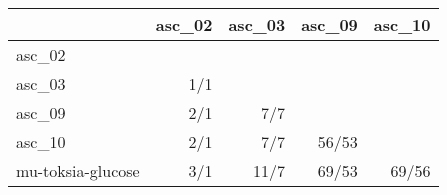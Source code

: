 \begin{tabular}{lrrrr}
\toprule
 & asc_02 & asc_03 & asc_09 & asc_10 \\
\midrule
asc_02 &  &  &  &  \\
asc_03 & 1/1 &  &  &  \\
asc_09 & 2/1 & 7/7 &  &  \\
asc_10 & 2/1 & 7/7 & 56/53 &  \\
mu-toksia-glucose & 3/1 & 11/7 & 69/53 & 69/56 \\
\bottomrule
\end{tabular}
